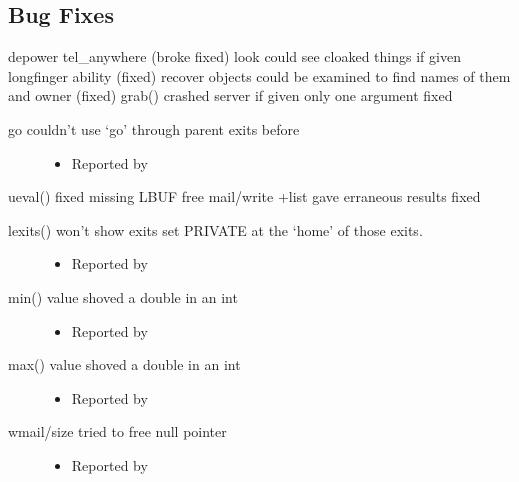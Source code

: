 \documentclass[letterpaper,10pt,english]{sphinxmanual}
\begin{document}
\subsection{Bug Fixes}
\label{\detokenize{changelog:id94}}
\sphinxAtStartPar
depower \sphinxhyphen{} tel\_anywhere (broke \sphinxhyphen{} fixed)
look \sphinxhyphen{} could see cloaked things if given long\sphinxhyphen{}finger ability (fixed)
recover objects \sphinxhyphen{} could be examined to find names of them and owner (fixed)
grab() \sphinxhyphen{} crashed server if given only one argument \sphinxhyphen{} fixed
\begin{description}
\item[{go \sphinxhyphen{} couldn’t use ‘go’ through parent exits before}] \leavevmode\begin{itemize}
\item {} 
\sphinxAtStartPar
Reported by 

\end{itemize}

\end{description}

\sphinxAtStartPar
ueval() \sphinxhyphen{} fixed missing LBUF free
mail/write +list \sphinxhyphen{} gave erraneous results \sphinxhyphen{} fixed
\begin{description}
\item[{lexits() \sphinxhyphen{} won’t show exits set PRIVATE at the ‘home’ of those exits.}] \leavevmode\begin{itemize}
\item {} 
\sphinxAtStartPar
Reported by 

\end{itemize}

\item[{min() \sphinxhyphen{} value shoved a double in an int}] \leavevmode\begin{itemize}
\item {} 
\sphinxAtStartPar
Reported by 

\end{itemize}

\item[{max() \sphinxhyphen{} value shoved a double in an int}] \leavevmode\begin{itemize}
\item {} 
\sphinxAtStartPar
Reported by 

\end{itemize}

\item[{wmail/size \sphinxhyphen{} tried to free null pointer}] \leavevmode\begin{itemize}
\item {} 
\sphinxAtStartPar
Reported by 

\end{itemize}

\end{description}
\end{document}
